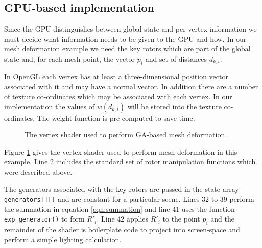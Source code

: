 \subsection{GPU-based implementation}

Since the GPU distinguishes between global state and per-vertex information we
must decide what information needs to be given to the GPU and how. In our mesh
deformation example we need the key rotors which are part of the global state
and, for each mesh point, the vector $p_i$ and set of distances $d_{k,i}$.

In OpenGL each vertex has at least a three-dimensional position vector associated 
with it and may have a normal vector. In addition there are a number of 
texture co-ordinates which may be associated with each vertex. In our implementation
the values of $w(d_{k,i})$ will be stored into the texture co-ordinates. The weight
function is pre-computed to save time.

\begin{figure}[p]
\centering
\scalebox{0.8}{
\begin{minipage}{\textwidth}
\singlespacing

\end{minipage}}
\caption{\label{fig:meshshader}The vertex shader used to perform GA-based mesh
deformation.}
\end{figure}

Figure \ref{fig:meshshader} gives the vertex shader used to perform mesh deformation in
this example. Line 2 includes the standard set of rotor manipulation functions which
were described above. 

The generators associated with the key rotors are passed in the state array {\tt generators[][]}
and are constant for a particular scene. Lines 32 to 39 perform the summation in 
equation \ref{eqn:summation} and line 41 uses the function {\tt exp\_generator()} to 
form $R'_i$. Line 42 applies $R'_i$ to the point $p_i$ and the remainder of the shader
is boilerplate code to project into screen-space and perform a simple lighting calculation.

